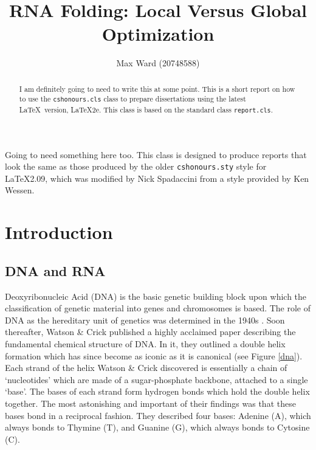 \documentclass{cshonours}
\title{RNA Folding: Local Versus Global Optimization}
\author{Max Ward (20748588)}
\begin{document}
\maketitle

\begin{abstract}
I am definitely going to need to write this at some point. This is a short report on how to use the {\tt cshonours.cls} class
to prepare dissertations using the latest \LaTeX\ version,
\LaTeX2e. This class is based on the standard class {\tt report.cls}.
\end{abstract}

\begin{acknowledgements}
Going to need something here too.
This class is designed to produce reports that look
the same as those produced by the older {\tt cshonours.sty} style for
\LaTeX 2.09, which was modified by Nick Spadaccini from a style
provided by Ken Wessen.
\end{acknowledgements}

\tableofcontents
\listoftables  %
\listoffigures  %



\chapter{Introduction}
\section{DNA and RNA}
Deoxyribonucleic Acid (DNA) is the basic genetic building block upon which the classification of genetic material into genes and chromosomes is based. The role of DNA as the hereditary unit of genetics was determined in the 1940s \cite{albertsessential}. Soon thereafter, Watson \& Crick \cite{watson1953molecular} published a highly acclaimed paper describing the fundamental chemical structure of DNA. In it, they outlined a double helix formation which has since become as iconic as it is canonical (see Figure \ref{dna}). Each strand of the helix Watson \& Crick discovered is essentially a chain of `nucleotides' which are made of a sugar-phosphate backbone, attached to a single `base'. The bases of each strand form hydrogen bonds which hold the double helix together. The most astonishing and important of their findings was that these bases bond in a reciprocal fashion. They described four bases: Adenine (A), which always bonds to Thymine (T), and Guanine (G), which always bonds to Cytosine (C).
\end{document}
